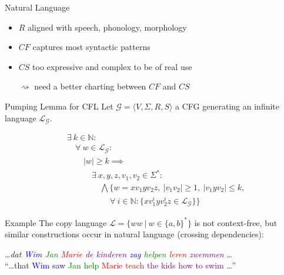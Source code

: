 \documentclass{beamer}
\begin{document}
\begin{frame}{Natural Language}
	\begin{itemize}
		\item $R$ aligned with speech, phonology, morphology
		\item $CF$ captures \alert{most} syntactic patterns
		\item $CS$ too expressive and complex to be of real use
		\item [$\rightsquigarrow$] need a better charting between $CF$ and $CS$
	\end{itemize}
\end{frame}

\begin{frame}{Pumping Lemma for CFL}
	\small 
	Let $\mathcal{G}=\langle V, \Sigma, R, S \rangle$ a CFG generating an infinite language $\mathcal{L}_\mathcal{G}$.	
	
	\begin{align*}
		&\exists \ k \in \mathbb{N}: \\
		& \quad \forall \ w \in \mathcal{L}_\mathcal{G}:\\
		& \quad \quad |w| \geq k \implies\\
		& \quad \quad \quad \exists \ x,y,z,v_1,v_2 \in \Sigma^*:\\
		& \quad \quad \quad \quad \bigwedge \Big\{  w = xv_1yv_2z, \ |v_1v_2|\geq 1, \ |v_1yv_2| \leq k,\\
		& \quad \quad \quad \quad \quad \ \forall \ i \in \mathbb{N}: \{ xv_1^iyv_2^iz \in \mathcal{L}_\mathcal{G} \}\Big\}
	\end{align*}
	\pause
	
	\begin{block}{Example}
	The copy language $\mathcal{L} = \{ww \ | \ w \in \{a,b\}^*\}$ is \alert{not} context-free, but similar constructions occur
	in natural language (crossing dependencies):
	\begin{center}
		\dots \textit{dat \textcolor{blue}{Wim} \textcolor{green}{Jan} \textcolor{red}{Marie} \textcolor{purple}{de kinderen}
		\textcolor{blue}{zag} \textcolor{green}{helpen} \textcolor{red}{leren} \textcolor{purple}{zwemmen}} \dots\\
		``\dots that \textcolor{blue}{Wim saw} \textcolor{green}{Jan help} \textcolor{red}{Marie teach} \textcolor{purple}{the kids how to swim} \dots''
	\end{center}
	\end{block}
\end{frame}
\end{document}
